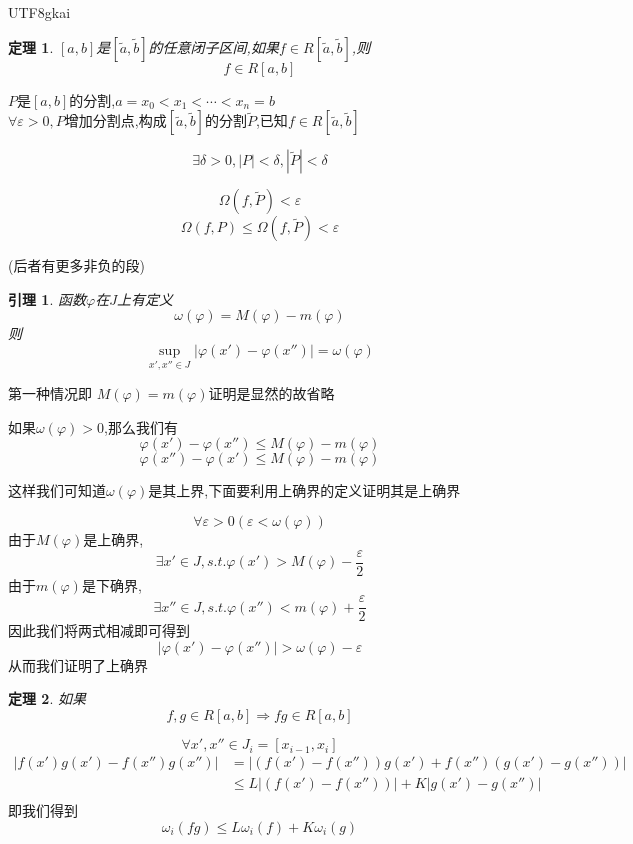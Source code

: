 \documentclass{article}
\newtheorem{theorem}{定理}[subsection]
\newtheorem{lemma}{引理}[subsection]
\newenvironment{cproof}{%
\heiti{证明}\kaishu
}{%
}
\begin{document}
\begin{CJK}{UTF8}{gkai}
\begin{theorem}
  $[a,b]$是$[\tilde{a},\tilde{b}]$的任意闭子区间,如果$f\in R[\tilde{a},\tilde{b}]$,则
  \[f\in R[a,b]\]
\end{theorem}

\begin{cproof}
$P$是$[a,b]$的分割,$a = x_0 < x_1 < \cdots < x_n = b$\\

$\forall \varepsilon > 0,P$增加分割点,构成$[\tilde{a},\tilde{b}]$的分割$\tilde{P}$,已知$f\in R[\tilde{a},\tilde{b}]$

\[\exists \delta > 0,|P| < \delta ,|\tilde{P}| < \delta\]

\[\Omega(f,\tilde{P}) < \varepsilon\]
\[\Omega(f,P) \leq\Omega(f,\tilde{P}) < \varepsilon\]

(后者有更多非负的段)
\end{cproof}

\begin{lemma}
  函数$\varphi$在$J$上有定义
  \[\omega(\varphi) = M(\varphi) - m(\varphi)\]
  则
  \[\sup_{x',x''\in J}|\varphi(x') - \varphi(x'')| = \omega(\varphi)\]
\end{lemma}

\begin{cproof}
  第一种情况即 $M(\varphi) = m(\varphi)$证明是显然的故省略

  如果$\omega(\varphi) > 0$,那么我们有
  \[\varphi(x') - \varphi(x'') \leq M(\varphi) - m(\varphi)\]
  \[ \varphi(x'')-\varphi(x')  \leq M(\varphi) - m(\varphi)\]

  这样我们可知道$\omega(\varphi)$是其上界,下面要利用上确界的定义证明其是上确界

  \[\forall \varepsilon > 0 (\varepsilon < \omega(\varphi))\]
  由于$M(\varphi)$是上确界,\[\exists x'\in J ,s.t.\varphi(x') > M(\varphi) - \dfrac{\varepsilon}{2}\]
  由于$m(\varphi)$是下确界,\[\exists x''\in J ,s.t.\varphi(x'') < m(\varphi) + \dfrac{\varepsilon}{2}\]
  因此我们将两式相减即可得到
  \[|\varphi(x') - \varphi(x'')| > \omega(\varphi) - \varepsilon\]
  从而我们证明了上确界
\end{cproof}

\begin{theorem}
  如果  \[f,g\in R[a,b] \Rightarrow fg \in R[a,b]\]
\end{theorem}

\begin{cproof}
  \[\forall x',x''\in J_i = [x_{i - 1},x_i]\]
  \[
  \begin{aligned}  
  |f(x')g(x') - f(x'')g(x'')|
  &=|(f(x')-f(x''))g(x') + f(x'')(g(x') - g(x''))|\\
  &\leq L|(f(x')-f(x''))| + K|g(x') - g(x'')|\\
  \end{aligned}
  \]
  即我们得到
  \[\omega_i(fg) \leq L\omega_i(f) + K\omega_i(g)    \]


\end{cproof}
\end{CJK}
\end{document}
